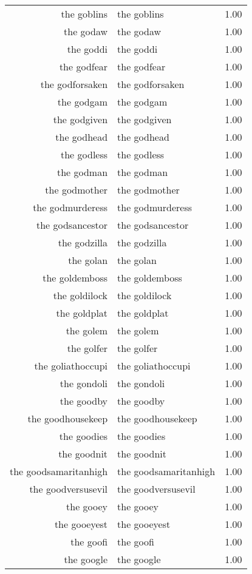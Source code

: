 \begin{table}[ht]
\begin{tabular}{rlr}
  the goblins & the goblins & 1.00 \\ 
  the godaw & the godaw & 1.00 \\ 
  the goddi & the goddi & 1.00 \\ 
  the godfear & the godfear & 1.00 \\ 
  the godforsaken & the godforsaken & 1.00 \\ 
  the godgam & the godgam & 1.00 \\ 
  the godgiven & the godgiven & 1.00 \\ 
  the godhead & the godhead & 1.00 \\ 
  the godless & the godless & 1.00 \\ 
  the godman & the godman & 1.00 \\ 
  the godmother & the godmother & 1.00 \\ 
  the godmurderess & the godmurderess & 1.00 \\ 
  the godsancestor & the godsancestor & 1.00 \\ 
  the godzilla & the godzilla & 1.00 \\ 
  the golan & the golan & 1.00 \\ 
  the goldemboss & the goldemboss & 1.00 \\ 
  the goldilock & the goldilock & 1.00 \\ 
  the goldplat & the goldplat & 1.00 \\ 
  the golem & the golem & 1.00 \\ 
  the golfer & the golfer & 1.00 \\ 
  the goliathoccupi & the goliathoccupi & 1.00 \\ 
  the gondoli & the gondoli & 1.00 \\ 
  the goodby & the goodby & 1.00 \\ 
  the goodhousekeep & the goodhousekeep & 1.00 \\ 
  the goodies & the goodies & 1.00 \\ 
  the goodnit & the goodnit & 1.00 \\ 
  the goodsamaritanhigh & the goodsamaritanhigh & 1.00 \\ 
  the goodversusevil & the goodversusevil & 1.00 \\ 
  the gooey & the gooey & 1.00 \\ 
  the gooeyest & the gooeyest & 1.00 \\ 
  the goofi & the goofi & 1.00 \\ 
  the google & the google & 1.00 \\ 

\end{tabular}
\end{table}
